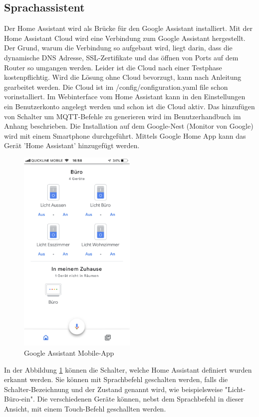 \subsection{Sprachassistent}
Der Home Assistant wird als Brücke für den Google Assistant installiert. Mit der Home Assistant Cloud wird eine Verbindung zum Google Assistant hergestellt. Der Grund, warum die Verbindung so aufgebaut wird, liegt darin, dass die dynamische DNS Adresse, SSL-Zertifikate und das öffnen von Ports auf dem Router so umgangen werden. Leider ist die Cloud nach einer Testphase kostenpflichtig. Wird die Lösung ohne Cloud bevorzugt, kann nach Anleitung \cite{assistant_google_nodate} gearbeitet werden. Die Cloud ist im /config/configuration.yaml file schon vorinstalliert. Im Webinterface vom Home Assistant kann in den Einstellungen ein Benutzerkonto angelegt werden und schon ist die Cloud aktiv. Das hinzufügen von Schalter um MQTT-Befehle zu generieren wird im Benutzerhandbuch im Anhang beschrieben. Die Installation auf dem Google-Nest (Monitor von Google) wird mit einem Smartphone durchgeführt. Mittels Google Home App kann das Gerät 'Home Assistant' hinzugefügt werden.
\begin{figure}[H]
	\centering
	\includegraphics[width=0.5\textwidth]{graphics/GoogleAssistant.png}
	\caption{Google Assistant Mobile-App}
	\label{pic: GoogleAssistant}
\end{figure}   
In der Abbildung \ref{pic: GoogleAssistant} können die Schalter, welche Home Assistant definiert wurden erkannt werden. Sie können mit Sprachbefehl geschalten werden, falls die Schalter-Bezeichnung und der Zustand genannt wird, wie beispielsweise "Licht-Büro-ein". Die verschiedenen Geräte können, nebst dem Sprachbefehl in dieser Ansicht, mit einem Touch-Befehl geschallten werden.
